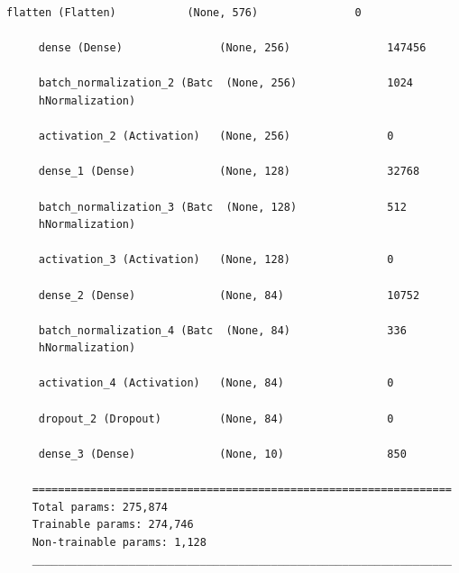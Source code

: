 \documentclass{article}
\begin{document}
\begin{lstlisting}[style=siec]
     flatten (Flatten)           (None, 576)               0         
                                                                     
     dense (Dense)               (None, 256)               147456    
                                                                     
     batch_normalization_2 (Batc  (None, 256)              1024      
     hNormalization)                                                 
                                                                     
     activation_2 (Activation)   (None, 256)               0         
                                                                     
     dense_1 (Dense)             (None, 128)               32768     
                                                                     
     batch_normalization_3 (Batc  (None, 128)              512       
     hNormalization)                                                 
                                                                     
     activation_3 (Activation)   (None, 128)               0         
                                                                     
     dense_2 (Dense)             (None, 84)                10752     
                                                                     
     batch_normalization_4 (Batc  (None, 84)               336       
     hNormalization)                                                 
                                                                     
     activation_4 (Activation)   (None, 84)                0         
                                                                     
     dropout_2 (Dropout)         (None, 84)                0         
                                                                     
     dense_3 (Dense)             (None, 10)                850       
                                                                     
    =================================================================
    Total params: 275,874
    Trainable params: 274,746
    Non-trainable params: 1,128
    _________________________________________________________________
\end{lstlisting}
\end{document}
